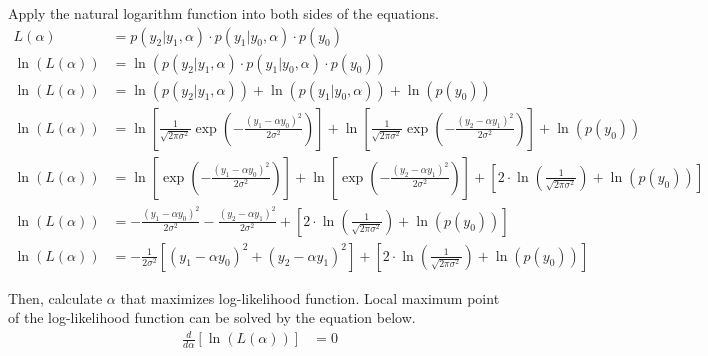 \documentclass[12pt, a4paper]{article}
\begin{document}
            \noindent Apply the natural logarithm function into both sides of the equations.
            \begin{align*}
                L(\alpha) &= p(y_{2}|y_{1}, \alpha) \cdot p(y_{1}|y_{0}, \alpha) \cdot p(y_{0}) \\[1em]
                \ln(L(\alpha)) &= \ln(p(y_{2}|y_{1}, \alpha) \cdot p(y_{1}|y_{0}, \alpha) \cdot p(y_{0})) \\[1em]
                \ln(L(\alpha)) &= \ln(p(y_{2}|y_{1}, \alpha)) + \ln(p(y_{1}|y_{0}, \alpha)) + \ln(p(y_{0})) \\[1em]
                \ln(L(\alpha)) &= \ln\left[
                    \frac{1}{\sqrt{2\pi\sigma^{2}}} \exp\left( -\frac{(y_{1} - \alpha y_{0})^{2}}{2\sigma^{2}} \right)
                    \right]
                    + \ln\left[
                        \frac{1}{\sqrt{2\pi\sigma^{2}}} \exp\left( -\frac{(y_{2} - \alpha y_{1})^{2}}{2\sigma^{2}} \right)
                    \right]
                    + \ln(p(y_{0})) \\[1em]
                \ln(L(\alpha)) &= \ln\left[
                    \exp\left( -\frac{(y_{1} - \alpha y_{0})^{2}}{2\sigma^{2}} \right)
                    \right]
                    + \ln\left[
                        \exp\left( -\frac{(y_{2} - \alpha y_{1})^{2}}{2\sigma^{2}} \right)
                    \right]
                    + \left[
                        2 \cdot \ln\left( \frac{1}{\sqrt{2\pi\sigma^{2}}} \right)
                        + \ln(p(y_{0}))
                    \right] \\[1em]
                \ln(L(\alpha)) &= -\frac{(y_{1} - \alpha y_{0})^{2}}{2\sigma^{2}}
                    -\frac{(y_{2} - \alpha y_{1})^{2}}{2\sigma^{2}}
                    + \left[
                        2 \cdot \ln\left( \frac{1}{\sqrt{2\pi\sigma^{2}}} \right)
                        + \ln(p(y_{0}))
                    \right] \\[1em]
                \ln(L(\alpha)) &= -\frac{1}{2\sigma^{2}} \left[  
                        (y_{1} - \alpha y_{0})^{2} + (y_{2} - \alpha y_{1})^{2}
                    \right]
                    + \left[
                        2 \cdot \ln\left( \frac{1}{\sqrt{2\pi\sigma^{2}}} \right)
                        + \ln(p(y_{0}))
                    \right]
            \end{align*}

            \vspace{1em}

            Then, calculate $\alpha$ that maximizes log-likelihood function. Local maximum point of the log-likelihood function can be solved by the equation below.
            \begin{align*}
                \frac{d}{d\alpha}\left[ \ln(L(\alpha)) \right] &= 0
            \end{align*}
\end{document}
